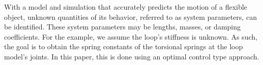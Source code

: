 \documentclass[letterpaper, 10pt, conference]{ieeeconf}
\begin{document}
With a model and simulation that accurately predicts the motion of a flexible object, unknown quantities of its behavior, referred to as system parameters, can be identified.  These system parameters may be lengths, masses, or damping coefficients.  For the example, we assume the loop's stiffness is unknown.  As such, the goal is to obtain the spring constants of the torsional springs at the loop model's joints.  In this paper, this is done using an optimal control type approach.







\end{document}
